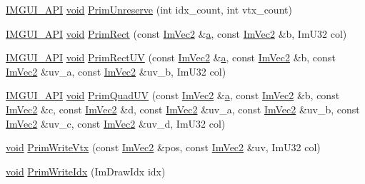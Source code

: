 \begin{DoxyCompactItemize}
\hyperlink{imgui_8h_a43829975e84e45d1149597467a14bbf5}{I\+M\+G\+U\+I\+\_\+\+A\+PI} \hyperlink{imgui__impl__opengl3__loader_8h_ac668e7cffd9e2e9cfee428b9b2f34fa7}{void} \hyperlink{structImDrawList_a618a5e0efdefce08daa888b45bf8a1d1}{Prim\+Unreserve} (int idx\+\_\+count, int vtx\+\_\+count)
\item 
\hyperlink{imgui_8h_a43829975e84e45d1149597467a14bbf5}{I\+M\+G\+U\+I\+\_\+\+A\+PI} \hyperlink{imgui__impl__opengl3__loader_8h_ac668e7cffd9e2e9cfee428b9b2f34fa7}{void} \hyperlink{structImDrawList_ae2be093563f1d20b8190b7c423113925}{Prim\+Rect} (const \hyperlink{structImVec2}{Im\+Vec2} \&\hyperlink{pointer_8h_aeeddce917cf130d62c370b8f216026dd}{a}, const \hyperlink{structImVec2}{Im\+Vec2} \&b, Im\+U32 col)
\item 
\hyperlink{imgui_8h_a43829975e84e45d1149597467a14bbf5}{I\+M\+G\+U\+I\+\_\+\+A\+PI} \hyperlink{imgui__impl__opengl3__loader_8h_ac668e7cffd9e2e9cfee428b9b2f34fa7}{void} \hyperlink{structImDrawList_a77d48ed5b33ccdd908824c0a3bebfff8}{Prim\+Rect\+UV} (const \hyperlink{structImVec2}{Im\+Vec2} \&\hyperlink{pointer_8h_aeeddce917cf130d62c370b8f216026dd}{a}, const \hyperlink{structImVec2}{Im\+Vec2} \&b, const \hyperlink{structImVec2}{Im\+Vec2} \&uv\+\_\+a, const \hyperlink{structImVec2}{Im\+Vec2} \&uv\+\_\+b, Im\+U32 col)
\item 
\hyperlink{imgui_8h_a43829975e84e45d1149597467a14bbf5}{I\+M\+G\+U\+I\+\_\+\+A\+PI} \hyperlink{imgui__impl__opengl3__loader_8h_ac668e7cffd9e2e9cfee428b9b2f34fa7}{void} \hyperlink{structImDrawList_a9df27414aaca5f34ac3664a8b82582b5}{Prim\+Quad\+UV} (const \hyperlink{structImVec2}{Im\+Vec2} \&\hyperlink{pointer_8h_aeeddce917cf130d62c370b8f216026dd}{a}, const \hyperlink{structImVec2}{Im\+Vec2} \&b, const \hyperlink{structImVec2}{Im\+Vec2} \&c, const \hyperlink{structImVec2}{Im\+Vec2} \&d, const \hyperlink{structImVec2}{Im\+Vec2} \&uv\+\_\+a, const \hyperlink{structImVec2}{Im\+Vec2} \&uv\+\_\+b, const \hyperlink{structImVec2}{Im\+Vec2} \&uv\+\_\+c, const \hyperlink{structImVec2}{Im\+Vec2} \&uv\+\_\+d, Im\+U32 col)
\item 
\hyperlink{imgui__impl__opengl3__loader_8h_ac668e7cffd9e2e9cfee428b9b2f34fa7}{void} \hyperlink{structImDrawList_af86de4faf6c8e978fb712ea14c5d0c5f}{Prim\+Write\+Vtx} (const \hyperlink{structImVec2}{Im\+Vec2} \&pos, const \hyperlink{structImVec2}{Im\+Vec2} \&uv, Im\+U32 col)
\item 
\hyperlink{imgui__impl__opengl3__loader_8h_ac668e7cffd9e2e9cfee428b9b2f34fa7}{void} \hyperlink{structImDrawList_a42b72f87a0084c02f11dcd1560c8bbc7}{Prim\+Write\+Idx} (Im\+Draw\+Idx idx)

\end{DoxyCompactItemize}
